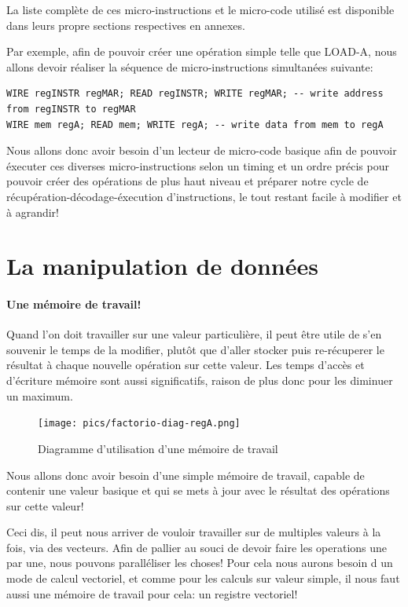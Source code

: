 \documentclass{scrreprt}
\begin{document}
	\begin{info}
		La liste complète de ces micro-instructions et le micro-code utilisé est disponible dans leurs propre sections respectives en annexes.
	\end{info}
	
	Par exemple, afin de pouvoir créer une opération simple telle que LOAD-A, nous allons devoir réaliser la séquence de micro-instructions simultanées suivante: 
	
	\begin{verbatim}
WIRE regINSTR regMAR; READ regINSTR; WRITE regMAR; -- write address from regINSTR to regMAR
WIRE mem regA; READ mem; WRITE regA; -- write data from mem to regA
	\end{verbatim}
	
	
	Nous allons donc avoir besoin d'un lecteur de micro-code basique afin de pouvoir éxecuter ces diverses micro-instructions selon un timing et un ordre précis pour pouvoir créer des opérations de plus haut niveau et préparer notre cycle de récupération-décodage-éxecution d'instructions, le tout restant facile à modifier et à agrandir!
	
	\section{La manipulation de données}
	
	\paragraph{Une mémoire de travail!}
	Quand l'on doit travailler sur une valeur particulière, il peut être utile de s'en souvenir le temps de la modifier, plutôt que d'aller stocker puis re-récuperer le résultat à chaque nouvelle opération sur cette valeur.
	Les temps d'accès et d'écriture mémoire sont aussi significatifs, raison de plus donc pour les diminuer un maximum.
	
	\begin{figure}[h]
		\centering
		\texttt{[image: pics/factorio-diag-regA.png]}
		
		\caption{Diagramme d'utilisation d'une mémoire de travail}
	\end{figure}
	
	Nous allons donc avoir besoin d'une simple mémoire de travail, capable de contenir une valeur basique et qui se mets à jour avec le résultat des opérations sur cette valeur!
	
	
	Ceci dis, il peut nous arriver de vouloir travailler sur de multiples valeurs à la fois, via des vecteurs.
	Afin de pallier au souci de devoir faire les operations une par une, nous pouvons paralléliser les choses! 
	Pour cela nous aurons besoin d un mode de calcul vectoriel, et comme pour les calculs sur valeur simple, il nous faut aussi une mémoire de travail pour cela: un registre vectoriel!
	
\end{document}
